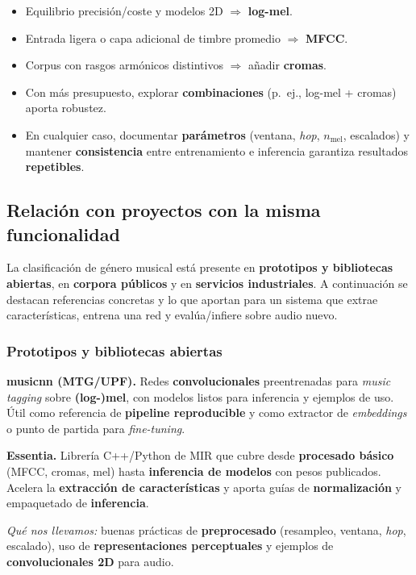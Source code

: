 \documentclass[12pt,twoside]{article}
\begin{document}
\begin{itemize}
  \item Equilibrio precisión/coste y modelos 2D $\Rightarrow$ \textbf{log-mel}.
  \item Entrada ligera o capa adicional de timbre promedio $\Rightarrow$ \textbf{MFCC}.
  \item Corpus con rasgos armónicos distintivos $\Rightarrow$ añadir \textbf{cromas}.
  \item Con más presupuesto, explorar \textbf{combinaciones} (p.~ej., log-mel + cromas) aporta robustez.
  \item En cualquier caso, documentar \textbf{parámetros} (ventana, \emph{hop}, $n_{\text{mel}}$, escalados) y mantener \textbf{consistencia} entre entrenamiento e inferencia garantiza resultados \textbf{repetibles}.
\end{itemize}

\subsection{Relación con proyectos con la misma funcionalidad}

La clasificación de género musical está presente en \textbf{prototipos y bibliotecas abiertas}, en \textbf{corpora públicos} y en \textbf{servicios industriales}. A continuación se destacan referencias concretas y lo que aportan para un sistema que extrae características, entrena una red y evalúa/infiere sobre audio nuevo.

\subsubsection{Prototipos y bibliotecas abiertas}

\textbf{musicnn (MTG/UPF).} Redes \textbf{convolucionales} preentrenadas para \emph{music tagging} sobre \textbf{(log-)mel}, con modelos listos para inferencia y ejemplos de uso. Útil como referencia de \textbf{pipeline reproducible} y como extractor de \emph{embeddings} o punto de partida para \emph{fine-tuning}.

\textbf{Essentia.} Librería C++/Python de MIR que cubre desde \textbf{procesado básico} (MFCC, cromas, mel) hasta \textbf{inferencia de modelos} con pesos publicados. Acelera la \textbf{extracción de características} y aporta guías de \textbf{normalización} y empaquetado de \textbf{inferencia}.

\medskip
\noindent\textit{Qué nos llevamos:} buenas prácticas de \textbf{preprocesado} (resampleo, ventana, \emph{hop}, escalado), uso de \textbf{representaciones perceptuales} y ejemplos de \textbf{convolucionales 2D} para audio.
\end{document}
